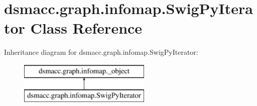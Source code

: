 \hypertarget{classdsmacc_1_1graph_1_1infomap_1_1SwigPyIterator}{}\section{dsmacc.\+graph.\+infomap.\+Swig\+Py\+Iterator Class Reference}
\label{classdsmacc_1_1graph_1_1infomap_1_1SwigPyIterator}
Inheritance diagram for dsmacc.\+graph.\+infomap.\+Swig\+Py\+Iterator\+:\begin{figure}[H]
\begin{center}
\leavevmode
\includegraphics[height=2.000000cm]{classdsmacc_1_1graph_1_1infomap_1_1SwigPyIterator}
\end{center}
\end{figure}
